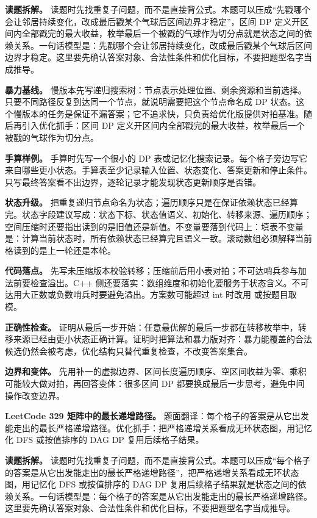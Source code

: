 \textbf{读题拆解。} 读题时先找重复子问题，而不是直接背公式。本题可以压成“先戳哪个会让邻居持续变化，改成最后戳某个气球后区间边界才稳定”，区间 DP 定义开区间内全部戳完的最大收益，枚举最后一个被戳的气球作为切分点就是状态之间的依赖关系。一句话模型是：先戳哪个会让邻居持续变化，改成最后戳某个气球后区间边界才稳定。这里要先确认答案对象、合法性条件和优化目标，不要把题型名字当成推导。

\textbf{暴力基线。} 慢版本先写递归搜索树：节点表示处理位置、剩余资源和当前选择。只要不同路径反复到达同一个节点，就说明需要把这个节点命名成 DP 状态。这个慢版本的任务是保证不漏答案；它不追求快，只负责给优化版提供对拍基准。随后再引入优化抓手：区间 DP 定义开区间内全部戳完的最大收益，枚举最后一个被戳的气球作为切分点。

\textbf{手算样例。} 手算时先写一个很小的 DP 表或记忆化搜索记录。每个格子旁边写它来自哪些更小状态。手算表至少记录输入位置、状态变化、答案更新和停止条件。只写最终答案看不出边界，逐轮记录才能发现状态更新顺序是否错。

\textbf{状态升级。} 把重复递归节点命名为状态；遍历顺序只是在保证依赖状态已经算完。状态字段建议写成：状态下标、状态值语义、初始化、转移来源、遍历顺序；空间压缩时还要指出读到的是旧值还是新值。不变量要落到代码上：填表不变量是：计算当前状态时，所有依赖状态已经算完且语义一致。滚动数组必须解释当前格读到的是上一轮还是本轮。

\textbf{代码落点。} 先写未压缩版本校验转移；压缩前后用小表对拍；不可达哨兵参与加法前要检查溢出。C++ 侧还要落实：数组维度和初始化要服务于状态含义。不可达用大正数或负数哨兵时要避免溢出。方案数可能超过 int 时改用  或按题目取模。

\textbf{正确性检查。} 证明从最后一步开始：任意最优解的最后一步都在转移枚举中，转移来源已经由更小状态正确计算。证明时把算法和暴力版对齐：暴力能覆盖的合法候选仍然会被考虑，优化结构只替代重复检查，不改变答案集合。

\textbf{边界和变体。} 先用补一的虚拟边界、区间长度遍历顺序、空区间收益为零、乘积可能较大做对拍，再回答变体：很多区间 DP 都要换成最后一步思考，避免中间操作改变边界。

\noindent\textbf{LeetCode 329 矩阵中的最长递增路径。} 题面翻译：每个格子的答案是从它出发能走出的最长严格递增路径。优化抓手：把严格递增关系看成无环状态图，用记忆化 DFS 或按值排序的 DAG DP 复用后续格子结果。

\textbf{读题拆解。} 读题时先找重复子问题，而不是直接背公式。本题可以压成“每个格子的答案是从它出发能走出的最长严格递增路径”，把严格递增关系看成无环状态图，用记忆化 DFS 或按值排序的 DAG DP 复用后续格子结果就是状态之间的依赖关系。一句话模型是：每个格子的答案是从它出发能走出的最长严格递增路径。这里要先确认答案对象、合法性条件和优化目标，不要把题型名字当成推导。

